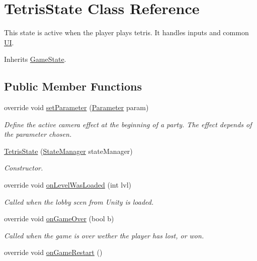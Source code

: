\hypertarget{class_tetris_state}{\section{Tetris\-State Class Reference}
\label{class_tetris_state}
}


This state is active when the player plays tetris. It handles inputs and common \hyperlink{class_u_i}{U\-I}.  




Inherits \hyperlink{class_game_state}{Game\-State}.

\subsection*{Public Member Functions}
\begin{DoxyCompactItemize}
\item 
override void \hyperlink{class_tetris_state_a4ee0712b5e803b4087534987c3f3d9b1}{set\-Parameter} (\hyperlink{class_parameter}{Parameter} param)
\begin{DoxyCompactList}\small\item\em Define the active camera effect at the beginning of a party. The effect depends of the parameter chosen. \end{DoxyCompactList}\item 
\hyperlink{class_tetris_state_ad153096aa421ebb4e495acf9d4db5579}{Tetris\-State} (\hyperlink{class_state_manager}{State\-Manager} state\-Manager)
\begin{DoxyCompactList}\small\item\em Constructor. \end{DoxyCompactList}\item 
override void \hyperlink{class_tetris_state_a3ad8b0d661a1c465ac3733dae9271d96}{on\-Level\-Was\-Loaded} (int lvl)
\begin{DoxyCompactList}\small\item\em Called when the lobby scen from Unity is loaded. \end{DoxyCompactList}\item 
override void \hyperlink{class_tetris_state_ab48517c445c4aa9f0bb53d5ee65e74dc}{on\-Game\-Over} (bool b)
\begin{DoxyCompactList}\small\item\em Called when the game is over wether the player has lost, or won. \end{DoxyCompactList}\item 
override void \hyperlink{class_tetris_state_a52ef3d1b0242151158a7894739b5e53e}{on\-Game\-Restart} ()

\end{DoxyCompactItemize}
